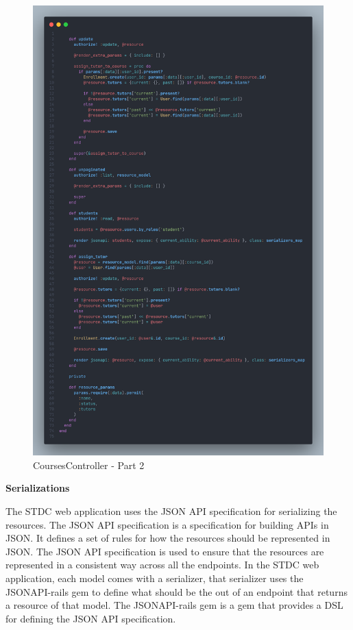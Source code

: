 \begin{justify}
    \begin{figure}[H]
        \centerline{\includegraphics[width=150mm,scale=1]{figures/implementation_and_testing/implementation/backend/courses_controller-2.png}}
        \caption{CoursesController - Part 2}
    \end{figure}


    \noindent\textbf{Serializations}

    \vspace{0.25cm}
    \newendline The STDC web application uses the JSON API specification for serializing the resources. The JSON API specification is a specification for building APIs in JSON. It defines a set of rules for how the resources should be represented in JSON. The JSON API specification is used to ensure that the resources are represented in a consistent way across all the endpoints. 
    In the STDC web application, each model comes with a serializer, that serializer uses the JSONAPI-rails gem to define what should be the out of an endpoint that returns a resource of that model. The JSONAPI-rails gem is a gem that provides a DSL for defining the JSON API specification.


\end{justify}
